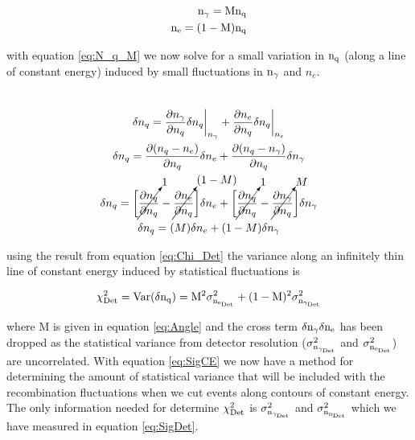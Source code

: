 \begin{equation}
\begin{split}
\rm n_\gamma = M n_q \\
\rm n_e = (1-M) n_q \\
\label{eq:N_q_M}
\end{split}
\end{equation}

\noindent with equation \ref{eq:N_q_M} we now solve for a small variation in $\rm n_q$ (along a line of constant energy) induced by small fluctuations in $\rm n_\gamma$ and $n_e$.

\begin{multline}\\
\delta n_q = \frac{\partial n_\gamma}{\partial n_q} \delta n_q \bigg|_{n_{\gamma}} + \frac{\partial n_e}{\partial n_q} \delta n_q \bigg|_{n_{e}} \\
\delta n_q = \frac{\partial (n_q-n_e)}{\partial n_q} \delta n_e + \frac{\partial (n_q-n_\gamma)}{\partial n_q} \delta n_\gamma \\
\delta n_q = \bigg[\cancelto{\tiny{1}}{\frac{\partial n_q}{\partial n_q}}-\cancelto{\tiny{(1-M)}}{\frac{\partial n_e}{\partial n_q}}\bigg] \delta n_e + \bigg[\cancelto{\tiny{1}}{\frac{\partial n_q}{\partial n_q}}-\cancelto{\tiny{M}}{\frac{\partial n_\gamma}{\partial n_q}}\bigg] \delta n_\gamma  \\
\delta n_q = (M) \delta n_e + (1-M) \delta n_\gamma \\
\label{eq:Chi_Det}
\end{multline}

\noindent using the result from equation \ref{eq:Chi_Det} the variance along an infinitely thin line of constant energy induced by statistical fluctuations is

\begin{equation}
\rm \chi_{Det}^2= Var(\delta n_q) = M^2\sigma_{n_{e_{Det}}}^2 + (1-M)^2\sigma_{n_{\gamma_{Det}}}^2
\label{eq:SigCE}
\end{equation}

\noindent where M is given in equation \ref{eq:Angle} and the cross term $\rm \delta n_\gamma \delta n_e$ has been dropped as the statistical variance from detector resolution ($\rm \sigma_{n_{\gamma_{Det}}}^2$ and $\rm \sigma_{n_{e_{Det}}}^2$) are uncorrelated. With equation \ref{eq:SigCE} we now have a method for determining the amount of statistical variance that will be included with the recombination fluctuations when we cut events along contours of constant energy. The only information needed for determine $\rm \chi_{Det}^2$ is $\rm \sigma_{n_{\gamma_{Det}}}^2$ and $\rm \sigma_{n_{n_{Det}}}^2$ which we have measured in equation \ref{eq:SigDet}. 

